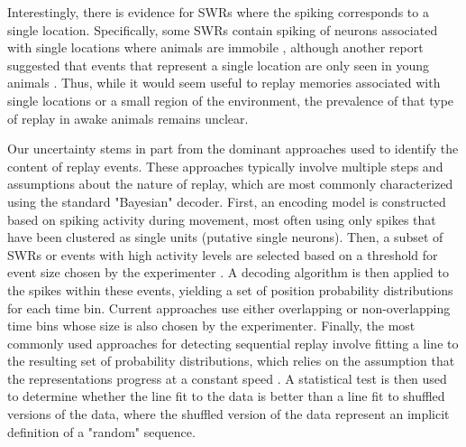 \documentclass[9pt,lineno]{elife}
\begin{document}
Interestingly, there is evidence for SWRs where the spiking corresponds to a single location. Specifically, some SWRs contain spiking of neurons associated with single locations where animals are immobile \citep{YuDistincthippocampalcorticalmemory2017}, although another report suggested that events that represent a single location are only seen in young animals \citep{StellaHippocampalReactivationRandom2019}. Thus, while it would seem useful to replay memories associated with single locations or a small region of the environment, the prevalence of that type of replay in awake animals remains unclear.

Our uncertainty stems in part from the dominant approaches used to identify the content of replay events. These approaches typically involve multiple steps and assumptions about the nature of replay, which are most commonly characterized using the standard "Bayesian" decoder. First, an encoding model is constructed based on spiking activity during movement, most often using only spikes that have been clustered as single units (putative single neurons). Then, a subset of SWRs or events with high activity levels are selected based on a threshold for event size chosen by the experimenter \citep{FosterReversereplaybehavioural2006, DibaForwardreversehippocampal2007a, KarlssonAwakereplayremote2009, StellaHippocampalReactivationRandom2019}. A decoding algorithm is then applied to the spikes within these events, yielding a set of position probability distributions for each time bin. Current approaches use either overlapping or non-overlapping time bins whose size is also chosen by the experimenter. Finally, the most commonly used approaches for detecting sequential replay involve fitting a line to the resulting set of probability distributions, which relies on the assumption that the representations progress at a constant speed \citep{FosterReversereplaybehavioural2006, DibaForwardreversehippocampal2007a, KarlssonAwakereplayremote2009, TingleyRoutingHippocampalRipples2020, BhattaraiDistincteffectsreward2020, ShinDynamicsAwakeHippocampalPrefrontal2019, DrieuNestedsequenceshippocampal2018, OlafsdottirTaskDemandsPredict2017, TangHippocampalPrefrontalReactivationLearning2017, CarrTransientSlowGamma2012, DavidsonHippocampalReplayExtended2009, KarlssonAwakereplayremote2009}. A statistical test is then used to determine whether the line fit to the data is better than a line fit to shuffled versions of the data, where the shuffled version of the data represent an implicit definition of a "random" sequence.
\end{document}
